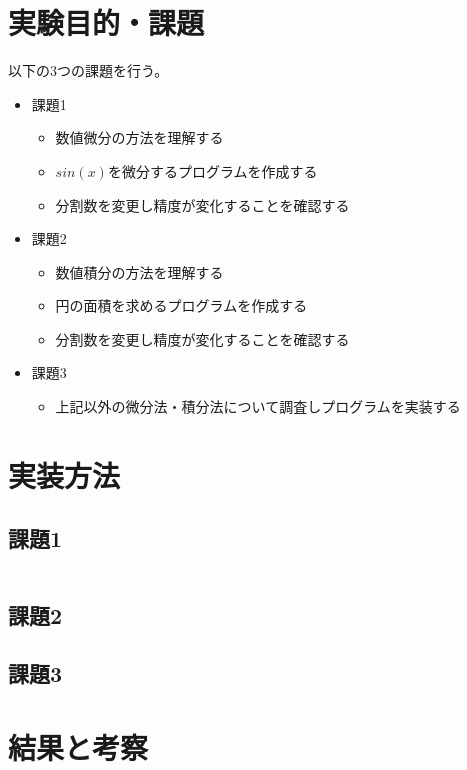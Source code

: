 \documentclass[dvipdfmx]{jsarticle}
\begin{document}
\section{実験目的・課題}
以下の3つの課題を行う。
\begin{itemize}
  \item 課題1
  \begin{itemize}
    \item 数値微分の方法を理解する
    \item $sin(x)$を微分するプログラムを作成する
    \item 分割数を変更し精度が変化することを確認する
  \end{itemize}
  \item 課題2
  \begin{itemize}
    \item 数値積分の方法を理解する
    \item 円の面積を求めるプログラムを作成する
    \item 分割数を変更し精度が変化することを確認する
  \end{itemize}
  \item 課題3
  \begin{itemize}
    \item 上記以外の微分法・積分法について調査しプログラムを実装する
  \end{itemize}
\end{itemize}

\section{実装方法}

\subsection{課題1}

\begin{equation}
\end{equation}

\subsection{課題2}
\subsection{課題3}

\section{結果と考察}

\begin{thebibliography}{10}
  
  \url{}
\end{thebibliography}
\end{document}
